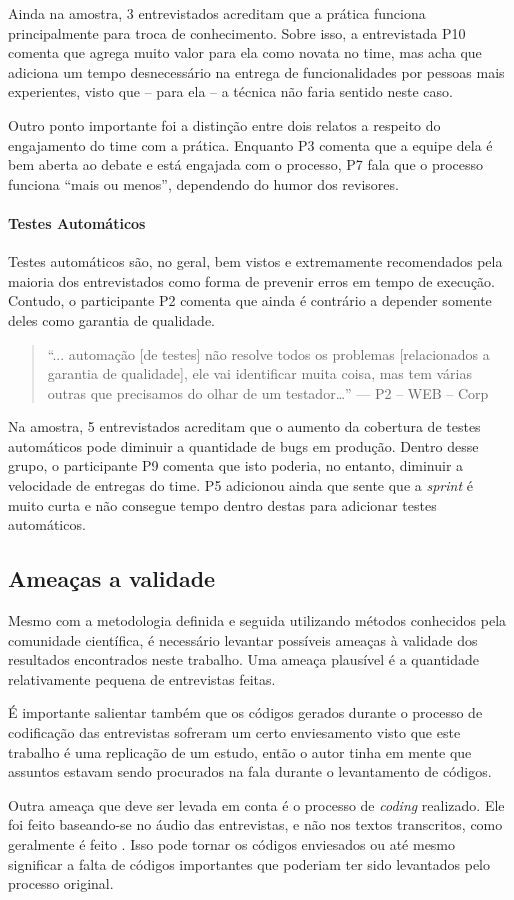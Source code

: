 Ainda na amostra, 3 entrevistados acreditam que a prática funciona principalmente para troca de conhecimento. Sobre isso, a entrevistada P10 comenta que agrega muito valor para ela como novata no time, mas acha que adiciona um tempo desnecessário na entrega de funcionalidades por pessoas mais experientes, visto que -- para ela -- a técnica não faria sentido neste caso.

Outro ponto importante foi a distinção entre dois relatos a respeito do engajamento do time com a prática. Enquanto P3 comenta que a equipe dela é bem aberta ao debate e está engajada com o processo, P7 fala que o processo funciona ``mais ou menos'', dependendo do humor dos revisores.

\paragraph{Testes Automáticos}

Testes automáticos são, no geral, bem vistos e extremamente recomendados pela maioria dos entrevistados como forma de prevenir erros em tempo de execução. Contudo, o participante P2 comenta que ainda é contrário a depender somente deles como garantia de qualidade.

\begin{quote}
    ``... automação [de testes] não resolve todos os problemas [relacionados a garantia de qualidade], ele vai identificar muita coisa, mas tem várias outras que precisamos do olhar de um testador…'' --- P2 -- WEB -- Corp
\end{quote}

Na amostra, 5 entrevistados acreditam que o aumento da cobertura de testes automáticos pode diminuir a quantidade de bugs em produção. Dentro desse grupo, o participante P9 comenta que isto poderia, no entanto, diminuir a velocidade de entregas do time. P5 adicionou ainda que sente que a \emph{sprint} é muito curta e não consegue tempo dentro destas para adicionar testes automáticos.

\subsection{Ameaças a validade}

Mesmo com a metodologia definida e seguida utilizando métodos conhecidos pela comunidade científica, é necessário levantar possíveis ameaças à validade dos resultados encontrados neste trabalho. Uma ameaça plausível é a quantidade relativamente pequena de entrevistas feitas.

É importante salientar também que os códigos gerados durante o processo de codificação das entrevistas sofreram um certo enviesamento visto que este trabalho é uma replicação de um estudo, então o autor tinha em mente que assuntos estavam sendo procurados na fala durante o levantamento de códigos. 

Outra ameaça que deve ser levada em conta é o processo de \emph{coding} realizado. Ele foi feito baseando-se no áudio das entrevistas, e não nos textos transcritos, como geralmente é feito \cite{groundedTheory}. Isso pode tornar os códigos enviesados ou até mesmo significar a falta de códigos importantes que poderiam ter sido levantados pelo processo original.
